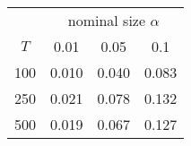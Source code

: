 % 
\begin{tabular}{cccc}
  \hline
  & \multicolumn{3}{c}{nominal size $\alpha$} \\
 $T$ & 0.01 & 0.05 & 0.1 \\
 \hline
100 & 0.010 & 0.040 & 0.083 \\ 
  250 & 0.021 & 0.078 & 0.132 \\ 
  500 & 0.019 & 0.067 & 0.127 \\ 
   \hline
\end{tabular}
